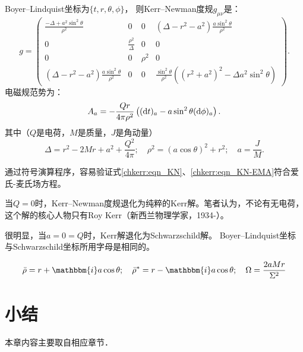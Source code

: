 Boyer--Lindquist坐标为$\{t,r,\theta,\phi\}$，
则Kerr--Newman度规\cite[\S 33.2]{mtw1973}$g_{\mu\nu}$是：
\begin{equation}\label{chkerr:eqn_KN}
 g=\begin{pmatrix}
    \frac{-\Delta+a^2\sin^2\theta }{\rho^2} & 0 & 0 & (\Delta -r^2-a^2)\frac{ a \sin^2\theta}{\rho^2} \\
    0 & \frac{\rho^2}{\Delta} & 0 & 0 \\
    0 & 0 & \rho^2 & 0 \\
    (\Delta -r^2-a^2)\frac{ a \sin^2\theta}{\rho^2} & 0 & 0 
    & \frac{\sin^2\theta}{\rho^2}((r^2+a^2)^2-\Delta a^2 \sin^2\theta) 
\end{pmatrix}.
\end{equation}
电磁规范势为：
\begin{equation}\label{chkerr:eqn_KN-EMA}
    A_a= -\frac{Q r}{4 \pi \rho^2 } \left(({\rm d}t)_a - a \sin ^2\theta ({\rm d}\phi)_a \right) .
\end{equation}
其中（$Q$是电荷，$M$是质量，$J$是角动量）
\begin{equation}
    \Delta =r^2-2M r +a^2+ \frac{Q^2 }{4\pi };\quad
    \rho^2=\left(a \cos \theta \right)^2+r^2;\quad
    a=\frac{J}{M}.
\end{equation}

通过符号演算程序，容易验证式\eqref{chkerr:eqn_KN}、\eqref{chkerr:eqn_KN-EMA}符合爱氏-麦氏场方程。

当$Q=0$时，Kerr--Newman度规退化为纯粹的Kerr解。笔者认为，不论有无电荷，
这个解的核心人物只有Roy Kerr（新西兰物理学家，1934-）。

很明显，当$a=0=Q$时，Kerr解退化为Schwarzschild解。
Boyer--Lindquist坐标与Schwarzschild坐标所用字母是相同的。

\begin{equation}
    \bar{\rho} =r+\mathbbm{i} a \cos\theta ;\quad 
\bar{\rho}^* =r-\mathbbm{i} a \cos \theta ;\quad
\Omega =\frac{2 a M r}{\Sigma^2}
\end{equation}


\section*{小结}
本章内容主要取自\parencite{chandrasekhar-1983}相应章节．


\printbibliography[heading=subbibliography,title=第\ref{chkerr}章参考文献]

\endinput
